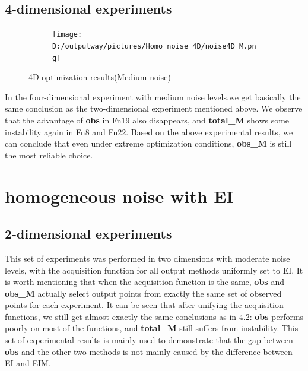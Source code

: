 \documentclass{article}
\begin{document}
\subsection{4-dimensional experiments}

\begin{figure}[H]
    \centering
    \begin{subfigure}[t]{1\linewidth}
        \centering
        \texttt{[image: D:/outputway/pictures/Homo\_noise\_4D/noise4D\_M.png]}
    \end{subfigure}
    \caption{4D optimization results(Medium noise)}
    \label{Fig8}
\end{figure}

\hspace{2em}In the four-dimensional experiment with medium noise levels,we get basically the same conclusion as the two-dimensional experiment mentioned above. We observe that the advantage of \textbf{obs} in Fn19 also disappears, and \textbf{total\_M} shows some instability again in Fn8 and Fn22. Based on the above experimental results, we can conclude that even under extreme optimization conditions, \textbf{obs\_M} is still the most reliable choice.

\section{homogeneous noise with EI}
\subsection{2-dimensional experiments}
\hspace{2em}This set of experiments was performed in two dimensions with moderate noise levels, with the acquisition function for all output methods uniformly set to EI. It is worth mentioning that when the acquisition function is the same, \textbf{obs} and \textbf{obs\_M} actually select output points from exactly the same set of observed points for each experiment. It can be seen that after unifying the acquisition functions, we still get almost exactly the same conclusions as in 4.2: \textbf{obs} performs poorly on most of the functions, and \textbf{total\_M} still suffers from instability. This set of experimental results is mainly used to demonstrate that the gap between \textbf{obs}  and the other two methods is not mainly caused by the difference between EI and EIM.
\end{document}
